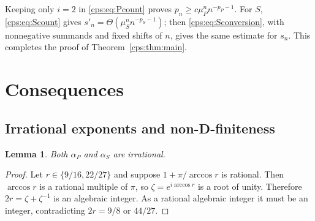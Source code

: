 \documentclass[11pt,letterpaper]{article}
\numberwithin{equation}{section}
\newtheorem{lemma}[theorem]{Lemma}
\theoremstyle{remark}\newtheorem{remark}[theorem]{Remark}
\begin{document}
Keeping only $i=2$ in \eqref{cps:eq:Pcount} proves
$p_n\ge c\mu_P^n n^{-p_P-1}$. For $S$, \eqref{cps:eq:Scount} gives
$s'_n=\Theta(\mu_S^n n^{-p_S-1})$; then \eqref{cps:eq:Sconversion}, with nonnegative summands and fixed shifts of $n$, gives the same estimate for $s_n$. This completes the proof of Theorem~\ref{cps:thm:main}.

\section{Consequences}\label{cps:sec:consequences}
\subsection{Irrational exponents and non-D-finiteness}
\begin{lemma}\label{cps:lem:irrational}
Both $\alpha_P$ and $\alpha_S$ are irrational.
\end{lemma}
\begin{proof}
Let $r\in\{9/16,22/27\}$ and suppose $1+\pi/\arccos r$ is rational. Then $\arccos r$ is a rational multiple of $\pi$, so $\zeta=e^{i\arccos r}$ is a root of unity. Therefore $2r=\zeta+\zeta^{-1}$ is an algebraic integer. As a rational algebraic integer it must be an integer, contradicting $2r=9/8$ or $44/27$.
\end{proof}
\end{document}
